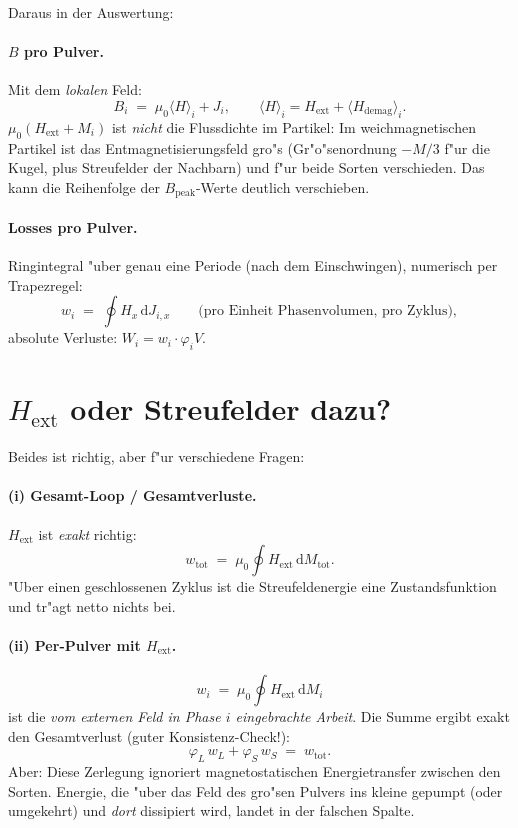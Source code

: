 \documentclass[11pt,a4paper]{article}
\begin{document}
Daraus in der Auswertung:

\paragraph{$B$ pro Pulver.} Mit dem \emph{lokalen} Feld:
\begin{equation}
B_i \;=\; \mu_0 \langle H \rangle_i + J_i ,
\qquad
\langle H \rangle_i = H_\text{ext} + \langle H_\text{demag} \rangle_i .
\end{equation}
$\mu_0 (H_\text{ext} + M_i)$ ist \emph{nicht} die Flussdichte im Partikel: Im weichmagnetischen Partikel ist das Entmagnetisierungsfeld gro"s (Gr"o"senordnung $-M/3$ f"ur die Kugel, plus Streufelder der Nachbarn) und f"ur beide Sorten verschieden. Das kann die Reihenfolge der $B_\mathrm{peak}$-Werte deutlich verschieben.

\paragraph{Losses pro Pulver.} Ringintegral "uber genau eine Periode (nach dem Einschwingen), numerisch per Trapezregel:
\begin{equation}
w_i \;=\; \oint H_x \, \mathrm{d}J_{i,x}
\qquad\text{(pro Einheit Phasenvolumen, pro Zyklus)},
\end{equation}
absolute Verluste: $W_i = w_i \cdot \varphi_i V$.

\section{$H_\text{ext}$ oder Streufelder dazu?}

Beides ist \glqq richtig\grqq, aber f"ur verschiedene Fragen:

\paragraph{(i) Gesamt-Loop / Gesamtverluste.} $H_\text{ext}$ ist \emph{exakt} richtig:
\begin{equation}
w_\text{tot} \;=\; \mu_0 \oint H_\text{ext} \, \mathrm{d}M_\text{tot} .
\end{equation}
"Uber einen geschlossenen Zyklus ist die Streufeldenergie eine Zustandsfunktion und tr"agt netto nichts bei.

\paragraph{(ii) Per-Pulver mit $H_\text{ext}$.}
\begin{equation}
w_i \;=\; \mu_0 \oint H_\text{ext} \, \mathrm{d}M_i
\end{equation}
ist die \emph{vom externen Feld in Phase $i$ eingebrachte Arbeit}. Die Summe ergibt exakt den Gesamtverlust (guter Konsistenz-Check!):
\begin{equation}
\varphi_L\, w_L + \varphi_S\, w_S \;=\; w_\text{tot} .
\end{equation}
Aber: Diese Zerlegung ignoriert magnetostatischen Energietransfer zwischen den Sorten. Energie, die "uber das Feld des gro"sen Pulvers ins kleine gepumpt (oder umgekehrt) und \emph{dort} dissipiert wird, landet in der falschen Spalte.
\end{document}
